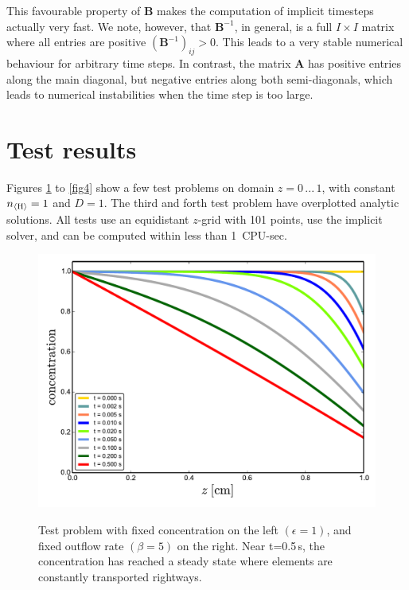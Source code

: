 \documentclass[11pt]{article}
\def\nH{n_{\langle\rm H\rangle}}
\begin{document}
This favourable property of $\mathbf{B}$ makes the computation
of implicit timesteps actually very fast. We note, however, that
$\mathbf{B}^{-1}$, in general, is a full $I\times I$ matrix where all
entries are positive $(\mathbf{B}^{-1})_{ij}>0$. This leads to a very
stable numerical behaviour for arbitrary time steps. In contrast, the
matrix $\mathbf{A}$ has positive entries along the main diagonal, but
negative entries along both semi-diagonals, which leads to numerical
instabilities when the time step is too large.

\section{Test results}

Figures \ref{fig1} to \ref{fig4} show a few test problems on domain
$z=0\,...\,1$, with constant $\nH=1$ and $D=1$. The third and forth
test problem have overplotted analytic solutions. All tests use
an equidistant $z$-grid with 101 points, use the implicit solver, 
and can be computed within less than 1\, CPU-sec.

\begin{figure}[!p]
\centering
\vspace*{-5mm}
\includegraphics[width=14cm]{test1.pdf}\\[-5mm]
\caption{Test problem with fixed concentration on the left
  $(\epsilon=1)$, and fixed outflow rate $(\beta=5)$ on the
  right. Near t=0.5\,s, the concentration has reached a steady state
  where elements are constantly transported rightways.}
\label{fig1}
\end{figure}
\end{document}
